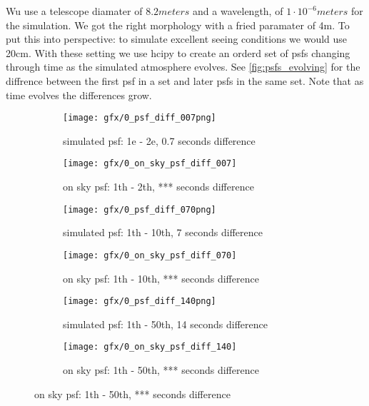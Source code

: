 Wu use a telescope diamater of $8.2 meters$ and a wavelength, of $1\cdot 10^{-6} meters$ for the simulation. We got the right morphology with a fried paramater of 4m. To put this into perspective: to simulate excellent seeing conditions we would use 20cm. With these setting we use hcipy to create an orderd set of psfs changing through time as the simulated atmosphere evolves. See \autoref{fig:psfs_evolving} for the diffrence between the first psf in a set and later psfs in the same set. Note that as time evolves the differences grow. 

\begin{figure}[h!]
  
      \begin{subfigure}[b]{0.5\textwidth}
        \texttt{[image: gfx/0\_psf\_diff\_007png]}
        \caption{simulated psf: 1e - 2e, 0.7 seconds difference}
      \end{subfigure}%
      \begin{subfigure}[b]{0.5\textwidth}
        \texttt{[image: gfx/0\_on\_sky\_psf\_diff\_007]}
        \caption{on sky psf: 1th - 2th, *** seconds difference}
      \end{subfigure}      
      
      \begin{subfigure}[b]{0.5\textwidth}
        \texttt{[image: gfx/0\_psf\_diff\_070png]}
        \caption{simulated psf: 1th - 10th, 7 seconds difference}
      \end{subfigure}%
      \begin{subfigure}[b]{0.5\textwidth}
        \texttt{[image: gfx/0\_on\_sky\_psf\_diff\_070]}
        \caption{on sky psf: 1th - 10th, *** seconds difference}
      \end{subfigure}
            
      \begin{subfigure}[b]{0.5\textwidth}
        \texttt{[image: gfx/0\_psf\_diff\_140png]}
        \caption{simulated psf: 1th - 50th, 14 seconds difference}
      \end{subfigure}%
      \begin{subfigure}[b]{0.5\textwidth}
        \texttt{[image: gfx/0\_on\_sky\_psf\_diff\_140]}
        \caption{on sky psf: 1th - 50th, *** seconds difference}
      \end{subfigure}


\end{figure}
